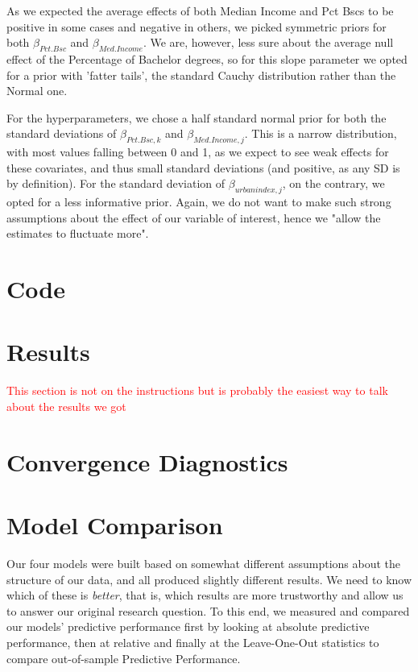 \documentclass[12pt]{article}
\begin{document}
As we expected the average effects of both Median Income and Pct Bscs to be positive in some cases and negative in others, we picked symmetric priors for both $\beta_{Pct.Bsc}$ and $\beta_{Med.Income}$. We are, however, less sure about the average null effect of the Percentage of Bachelor degrees, so for this slope parameter we opted for a prior with 'fatter tails', the standard Cauchy distribution rather than the Normal one.


For the hyperparameters, we chose a half standard normal prior for both the standard deviations of $\beta_{Pct.Bsc,k}$ and $\beta_{Med.Income,j}$. This is a narrow distribution, with most values falling between 0 and 1, as we expect to see weak effects for these covariates, and thus small standard deviations (and positive, as any SD is by definition). For the standard deviation of $\beta_{urbanindex,j}$, on the contrary, we opted for a less informative prior. Again, we do not want to make such strong assumptions about the effect of our variable of interest, hence we "allow the estimates to fluctuate more".






\section{Code}


\section{Results}

\textcolor{red}{This section is not on the instructions but is probably the easiest way to talk about the results we got }




\section{Convergence Diagnostics}



\section{Model Comparison}


Our four models were built based on somewhat different assumptions about the structure of our data, and all produced slightly different results. We need to know which of these is \textit{better}, that is, which results are more trustworthy and allow us to answer our original research question.
To this end, we measured and compared our models' predictive performance first by looking at absolute predictive performance, then at relative and finally at the Leave-One-Out statistics to compare out-of-sample Predictive Performance.
\end{document}
